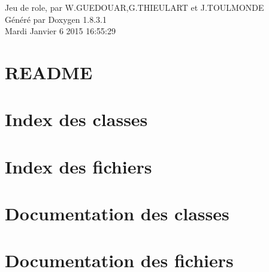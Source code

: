 \documentclass{book}
\begin{document}
\hypersetup{pageanchor=false,citecolor=blue}
\begin{titlepage}
\vspace*{7cm}
\begin{center}
{\Large Jeu de role, par W.\-G\-U\-E\-D\-O\-U\-A\-R,G.\-T\-H\-I\-E\-U\-L\-A\-R\-T et J.\-T\-O\-U\-L\-M\-O\-N\-D\-E }\\
\vspace*{1cm}
{\large Généré par Doxygen 1.8.3.1}\\
\vspace*{0.5cm}
{\small Mardi Janvier 6 2015 16:55:29}\\
\end{center}
\end{titlepage}
\clearemptydoublepage
{}
\tableofcontents
\clearemptydoublepage
{}
\hypersetup{pageanchor=true,citecolor=blue}
\chapter{R\-E\-A\-D\-M\-E}
\label{md_README}
\hypertarget{md_README}{}

\chapter{Index des classes}

\chapter{Index des fichiers}

\chapter{Documentation des classes}











\chapter{Documentation des fichiers}




















\printindex
\end{document}
